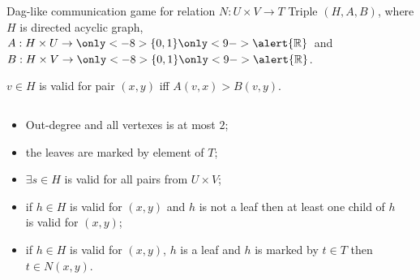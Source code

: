 \begin{frame}{Dag-like  communication game for relation $N: U \times V \to T$}
    Triple $(H, A, B)$, where $H$ is directed acyclic graph, $A: H \times U \to \only<-8>{\{0, 1\}}
    \only<9->{\alert{\mathbb{R}}}$~and $B: H \times V \to \only<-8>{\{0, 1\}} \only<9->{\alert{\mathbb{R}}}$.

    \pause
    $v \in H$ is valid for pair $(x, y)$ iff $A(v, x) > B(v, y)$.

    \pause

    \begin{columns}[t]
		\begin{column}{0.7\textwidth}
            \begin{itemize}
                \item<4-> Out-degree and all vertexes is at most $2$;
	            \item<5-> the leaves are marked by element of $T$;
    		    \item<6-> $\exists s \in H$ is valid for all pairs from $U \times V$;
		        \item<7-> if $h \in H$ is valid for $(x, y)$ and $h$ is not a leaf then at least one child of $h$ is valid for
	    	        $(x, y)$;
	    	    \item<8-> if $h \in H$ is valid for $(x, y)$, $h$ is a leaf and $h$ is marked by $t \in T$ then $t \in N(x, y)$.
	        \end{itemize}

        \end{column}
        
		\begin{column}{0.25\textwidth}
            
		\end{column}
	\end{columns}

\end{frame}


